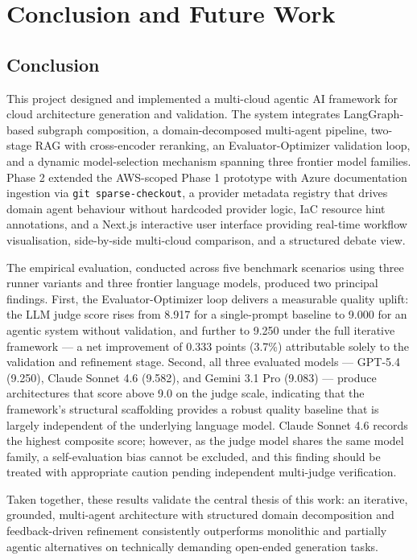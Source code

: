 \chapter{Conclusion and Future Work}

\section{Conclusion}

This project designed and implemented a multi-cloud agentic AI framework for cloud architecture generation and validation. The system integrates LangGraph-based subgraph composition, a domain-decomposed multi-agent pipeline, two-stage RAG with cross-encoder reranking, an Evaluator-Optimizer validation loop, and a dynamic model-selection mechanism spanning three frontier model families. Phase 2 extended the AWS-scoped Phase 1 prototype with Azure documentation ingestion via \texttt{git sparse-checkout}, a provider metadata registry that drives domain agent behaviour without hardcoded provider logic, IaC resource hint annotations, and a Next.js interactive user interface providing real-time workflow visualisation, side-by-side multi-cloud comparison, and a structured debate view.

The empirical evaluation, conducted across five benchmark scenarios using three runner variants and three frontier language models, produced two principal findings. First, the Evaluator-Optimizer loop delivers a measurable quality uplift: the LLM judge score rises from 8.917 for a single-prompt baseline to 9.000 for an agentic system without validation, and further to 9.250 under the full iterative framework — a net improvement of 0.333 points (3.7\%) attributable solely to the validation and refinement stage. Second, all three evaluated models — GPT-5.4 (9.250), Claude Sonnet 4.6 (9.582), and Gemini 3.1 Pro (9.083) — produce architectures that score above 9.0 on the judge scale, indicating that the framework's structural scaffolding provides a robust quality baseline that is largely independent of the underlying language model. Claude Sonnet 4.6 records the highest composite score; however, as the judge model shares the same model family, a self-evaluation bias cannot be excluded, and this finding should be treated with appropriate caution pending independent multi-judge verification.

Taken together, these results validate the central thesis of this work: an iterative, grounded, multi-agent architecture with structured domain decomposition and feedback-driven refinement consistently outperforms monolithic and partially agentic alternatives on technically demanding open-ended generation tasks.


